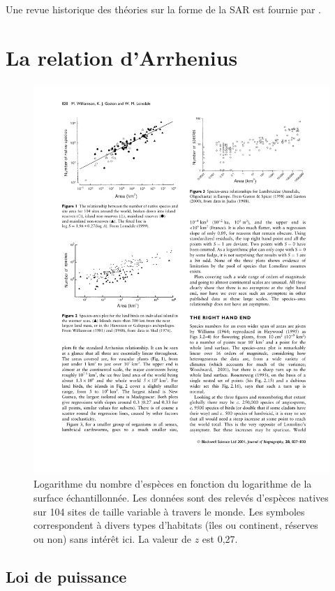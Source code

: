 \documentclass[
  11pt,
  french,
  a4paper,
  extrafontsizes,onecolumn,openright
  ]{memoir}
\begin{document}
Une revue historique des théories sur la forme de la SAR est fournie par \textcite{McGuinness1984}.

\hypertarget{sec:Arrhenius}{%
\section{La relation d'Arrhenius}\label{sec:Arrhenius}}



\scriptsize

\begin{figure}

{\centering \includegraphics[width=0.8\linewidth]{images/Williamson2001} 

}

\caption{Logarithme du nombre d'espèces en fonction du logarithme de la surface échantillonnée. Les données sont des relevés d'espèces natives sur 104 sites de taille variable à travers le monde. Les symboles correspondent à divers types d'habitats (îles ou continent, réserves ou non) sans intérêt ici. La valeur de \(z\) est 0,27.}\label{fig:Williamson2001}
\end{figure}

\normalsize

\hypertarget{loi-de-puissance}{%
\subsection{Loi de puissance}\label{loi-de-puissance}}
\end{document}
